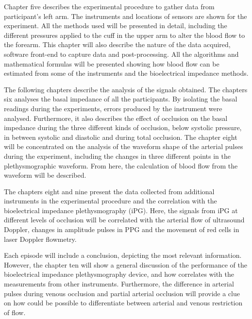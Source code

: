Chapter five describes the experimental procedure to gather data from participant's left arm. The instruments and locations of sensors are shown for the experiment. All the methods used will be presented in detail, including the different pressures applied to the cuff in the upper arm to alter the blood flow to the forearm. This chapter will also describe the nature of the data acquired, software front-end to capture data and post-processing. All the algorithms and mathematical formulas will be presented showing how blood flow can be estimated from some of the instruments and the bioelectrical impedance methods.  

The following chapters describe the analysis of the signals obtained. The chapters six analyses the basal impedance of all the participants. By isolating the basal readings during the experiments, errors produced by the instrument were analysed. Furthermore, it also describes the effect of occlusion on the basal impedance during the three different kinds of occlusion, below systolic pressure, in between systolic and diastolic and during total occlusion. The chapter eight will be concentrated on the analysis of the waveform shape of the arterial pulses during the experiment, including the changes in three different points in the plethysmographic waveform. From here, the calculation of blood flow from the waveform will be described. 

The chapters eight and nine present the data collected from additional instruments in the experimental procedure and the correlation with the bioelectrical impedance plethysmography (iPG). Here, the signals from iPG at different levels of occlusion will be correlated with the arterial flow of ultrasound Doppler, changes in amplitude pulses in PPG and the movement of red cells in laser Doppler flowmetry. 

Each episode will include a conclusion, depicting the most relevant information. However, the chapter ten will show a general discussion of the performance of the bioelectrical impedance plethysmography device, and how correlates with the measurements from other instruments. Furthermore, the difference in arterial pulses during venous occlusion and partial arterial occlusion will provide a clue on how could be possible to differentiate between arterial and venous restriction of flow. 


 

